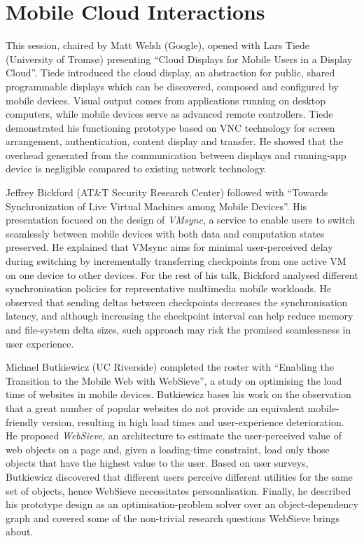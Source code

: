 \section{Mobile Cloud Interactions}
\label{sec:mobilecloud}

This session, chaired by Matt Welsh (Google), opened with Lars Tiede
(University of Tromsø) presenting ``Cloud Displays for Mobile Users in a
Display Cloud''. Tiede introduced the cloud display, an abstraction for
public, shared programmable displays which can be discovered, composed
and configured by mobile devices. Visual output comes from
applications running on desktop computers, while mobile devices serve as
advanced remote controllers. Tiede demonstrated his functioning
prototype based on VNC technology for screen arrangement,
authentication, content display and transfer. He showed that the
overhead generated from the communication between displays and
running-app device is negligible compared to existing network
technology.

Jeffrey Bickford (AT\&T Security Research Center) followed with
``Towards Synchronization of Live Virtual Machines among Mobile
Devices''. His presentation focused on the design of \emph{VMsync}, a
service to enable users to switch seamlessly between mobile devices
with both data and computation states preserved. He explained that VMsync
aims for minimal user-perceived delay during switching by incrementally
transferring checkpoints from one active VM on one device to other
devices. For the rest of his talk, Bickford analysed different
synchronisation policies for representative multimedia mobile workloads.
He observed that sending deltas between checkpoints decreases the
synchronisation latency, and although increasing the checkpoint interval
can help reduce memory and file-system delta sizes, such approach may
risk the promised seamlessness in user experience.

Michael Butkiewicz (UC Riverside) completed the roster with ``Enabling
the Transition to the Mobile Web with WebSieve'', a study on optimising
the load time of websites in mobile devices. Butkiewicz bases his work
on the observation that a great number of popular websites do
not provide an equivalent mobile-friendly version, resulting in high
load times and user-experience deterioration. He proposed
\emph{WebSieve}, an architecture to estimate the user-perceived value of
web objects on a page and, given a loading-time constraint, load only
those objects that have the highest value to the user. Based on user
surveys, Butkiewicz discovered that different users perceive different
utilities for the same set of objects, hence WebSieve necessitates
personalisation.  Finally, he described his prototype design as an
optimisation-problem solver over an object-dependency graph and covered
some of the non-trivial research questions WebSieve brings about.

